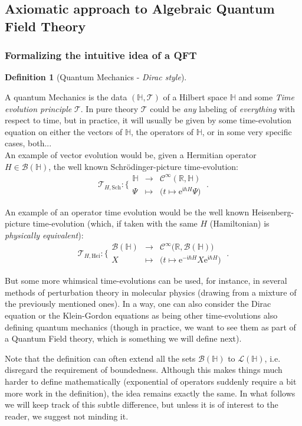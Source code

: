 \documentclass[a4paper,11pt]{article}
\numberwithin{equation}{section}
\theoremstyle{definition}
\newtheorem{definition}{Definition}
\newcommand{\e}{{\mathrm{e}}}
\begin{document}
\subsection{Axiomatic approach to Algebraic Quantum Field Theory}
\subsubsection{Formalizing the intuitive idea of a QFT}
\begin{definition}[Quantum Mechanics - \emph{Dirac style}]$\quad$

A quantum Mechanics is the data $(\mathbb{H},\mathcal{T})$ of a Hilbert space $\mathbb{H}$ and some \emph{Time evolution principle} $\mathcal{T}$. In pure theory $\mathcal{T}$ could be \emph{any} labeling of \emph{everything} with respect to time, but in practice, it will usually be given by some time-evolution equation on either the vectors of $\mathbb{H}$, the operators of $\mathbb{H}$, or in some very specific cases, both...\\
An example of vector evolution would be, given a Hermitian operator $H\in\mathcal{B}(\mathbb{H})$, the well known Schrödinger-picture time-evolution:
$$\boxed{\mathcal{T}_{H,\mathrm{Sch}}: \Bigg\{
\begin{matrix}
\mathbb{H} & \to & \mathcal{C}^\infty(\mathbb{R},\mathbb{H})\\
\Psi & \mapsto & \Big(t\mapsto \e^{\mathfrak{i}\hbar H}\Psi\Big)
\end{matrix}}\;.$$

An example of an operator time evolution would be the well known Heisenberg-picture time-evolution (which, if taken with the same $H$ (Hamiltonian) is \emph{physically equivalent}):
$$\boxed{\mathcal{T}_{H,\mathrm{Hei}}: \Bigg\{
\begin{matrix}
\mathcal{B}(\mathbb{H}) & \to & \mathcal{C}^\infty\big(\mathbb{R},\mathcal{B}(\mathbb{H})\big)\\
X & \mapsto & \Big(t\mapsto \e^{-\mathfrak{i}\hbar H}X\e^{\mathfrak{i}\hbar H}\Big)
\end{matrix}}\;.$$

But some more whimsical time-evolutions can be used, for instance, in several methods of perturbation theory in molecular physics (drawing from a mixture of the previously mentioned ones). In a way, one can also consider the Dirac equation or the Klein-Gordon equations as being other time-evolutions also defining quantum mechanics (though in practice, we want to see them as part of a Quantum Field theory, which is something we will define next).

Note that the definition can often extend all the sets $\mathcal{B}(\mathbb{H})$ to $\mathcal{L}(\mathbb{H})$, i.e. disregard the requirement of boundedness. Although this makes things much harder to define mathematically (exponential of operators suddenly require a bit more work in the definition), the idea remains exactly the same. In what follows we will keep track of this subtle difference, but unless it is of interest to the reader, we suggest not minding it.
\end{definition}
\end{document}
